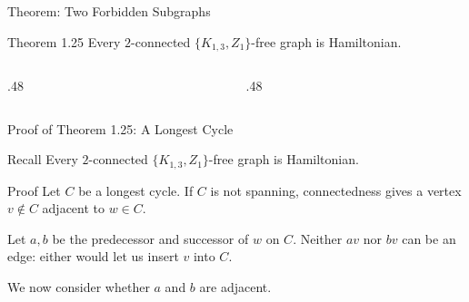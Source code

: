 \documentclass[aspectratio=169,11pt]{beamer}
\begin{document}
\begin{frame}{Theorem: Two Forbidden Subgraphs}
\large
\begin{block}{Theorem 1.25}
Every $2$-connected $\{K_{1,3},Z_1\}$-free graph is Hamiltonian.
\end{block}
\begin{columns}[c,onlytextwidth]\begin{column}{.48\textwidth}\begin{center}\end{center}\end{column}\begin{column}{.48\textwidth}\begin{center}\end{center}\end{column}\end{columns}
\end{frame}

\begin{frame}{Proof of Theorem 1.25: A Longest Cycle}
\large
\begin{block}{Recall}
Every $2$-connected $\{K_{1,3},Z_1\}$-free graph is Hamiltonian.
\end{block}
\begin{block}{Proof}
\normalsize Let $C$ be a longest cycle. If $C$ is not spanning, connectedness gives a vertex $v\notin C$ adjacent to $w\in C$.\par\medskip Let $a,b$ be the predecessor and successor of $w$ on $C$. Neither $av$ nor $bv$ can be an edge: either would let us insert $v$ into $C$.\par\medskip We now consider whether $a$ and $b$ are adjacent.
\end{block}

\end{frame}
\end{document}
